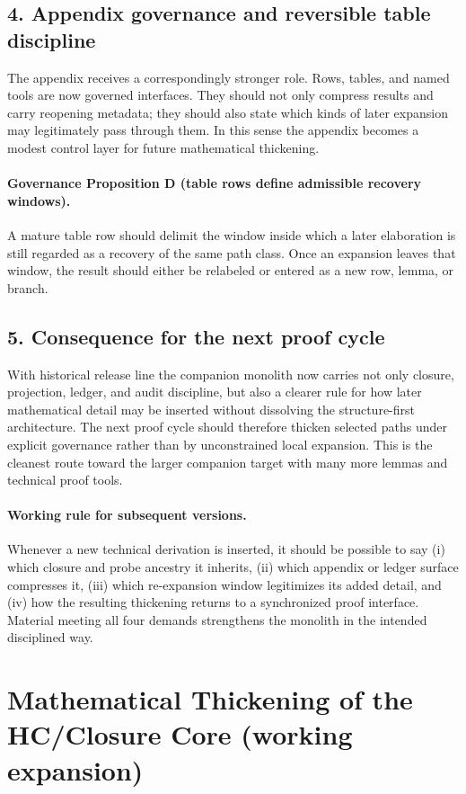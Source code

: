 \documentclass[12pt,a4paper]{article}
\DeclareRobustCommand{\QSCver}[1]{archival stage}
\renewcommand{\QSCver}[1]{historical release line}
\begin{document}
\subsection*{4. Appendix governance and reversible table discipline}
The appendix receives a correspondingly stronger role. Rows, tables, and named
tools are now governed interfaces. They should not only compress results and
carry reopening metadata; they should also state which kinds of later expansion
may legitimately pass through them. In this sense the appendix becomes a modest
control layer for future mathematical thickening.

\paragraph{Governance Proposition D (table rows define admissible recovery windows).}
A mature table row should delimit the window inside which a later elaboration is
still regarded as a recovery of the same path class. Once an expansion leaves
that window, the result should either be relabeled or entered as a new row,
lemma, or branch.

\subsection*{5. Consequence for the next proof cycle}
With \QSCver{v2.2.0} the companion monolith now carries not only closure,
projection, ledger, and audit discipline, but also a clearer rule for how later
mathematical detail may be inserted without dissolving the structure-first
architecture. The next proof cycle should therefore thicken selected paths under
explicit governance rather than by unconstrained local expansion. This is the
cleanest route toward the larger companion target with many more lemmas and
technical proof tools.

\paragraph{Working rule for subsequent versions.}
Whenever a new technical derivation is inserted, it should be possible to say
(i) which closure and probe ancestry it inherits, (ii) which appendix or ledger
surface compresses it, (iii) which re-expansion window legitimizes its added
detail, and (iv) how the resulting thickening returns to a synchronized proof
interface. Material meeting all four demands strengthens the monolith in the
intended disciplined way.


\clearpage
\section*{Mathematical Thickening of the HC/Closure Core (working expansion)}
\end{document}
